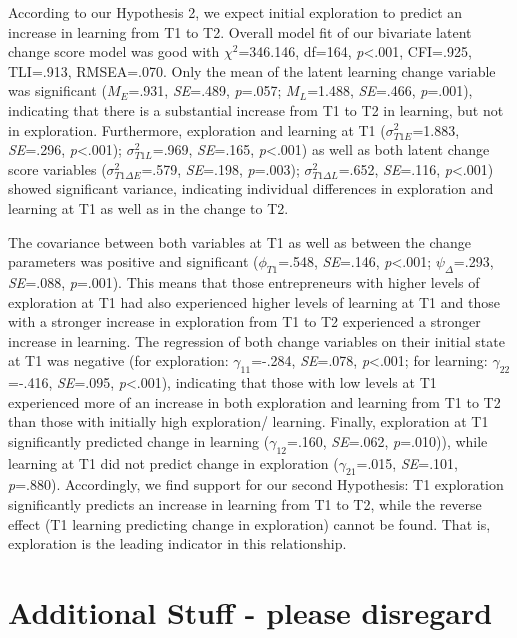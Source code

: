 \documentclass[man, 12pt, a4paper, noextraspace]{apa6}
\begin{document}
According to our Hypothesis 2, we expect initial exploration to predict an increase in learning from T1 to T2. 
Overall model fit of our bivariate latent change score model was good with $\chi^2$=346.146, df=164, \textit{p}<.001, CFI=.925, TLI=.913, RMSEA=.070. 
Only the mean of the latent learning change variable was significant ($\textit{M}_E$=.931, \textit{SE}=.489, \textit{p}=.057; $\textit{M}_L$=1.488, \textit{SE}=.466, \textit{p}=.001), indicating that there is a substantial increase from T1 to T2 in learning, but not in exploration. 
Furthermore, exploration and learning at T1 ($\sigma^2_{T1E}$=1.883, \textit{SE}=.296, \textit{p}<.001); $\sigma^2_{T1L}$=.969, \textit{SE}=.165, \textit{p}<.001) as well as both latent change score variables ($\sigma^2_{T1\Delta E}$=.579, \textit{SE}=.198, \textit{p}=.003); $\sigma^2_{T1\Delta L}$=.652, \textit{SE}=.116, \textit{p}<.001) showed significant variance, indicating individual differences in exploration and learning at T1 as well as in the change to T2. \par 
The covariance between both variables at T1 as well as between the change parameters was positive and significant ($\phi_{T1}$=.548, \textit{SE}=.146, \textit{p}<.001; $\psi_{\Delta}$=.293, \textit{SE}=.088, \textit{p}=.001). 
This means that those entrepreneurs with higher levels of exploration at T1 had also experienced higher levels of learning at T1 and those with a stronger increase in exploration from T1 to T2 experienced a stronger increase in learning. 
The regression of both change variables on their initial state at T1 was negative (for exploration: $\gamma_{11}$=-.284, \textit{SE}=.078, \textit{p}<.001; for learning: $\gamma_{22}$=-.416, \textit{SE}=.095, \textit{p}<.001), indicating that those with low levels at T1 experienced more of an increase in both exploration and learning from T1 to T2 than those with initially high exploration/ learning. 
Finally, exploration at T1 significantly predicted change in learning ($\gamma_{12}$=.160, \textit{SE}=.062, \textit{p}=.010)), while learning at T1 did not predict change in exploration ($\gamma_{21}$=.015, \textit{SE}=.101, \textit{p}=.880). 
Accordingly, we find support for our second Hypothesis: T1 exploration significantly predicts an increase in learning from T1 to T2, while the reverse effect (T1 learning predicting change in exploration) cannot be found. 
That is, exploration is the leading indicator in this relationship. 




\section{Additional Stuff - please disregard}
\end{document}

